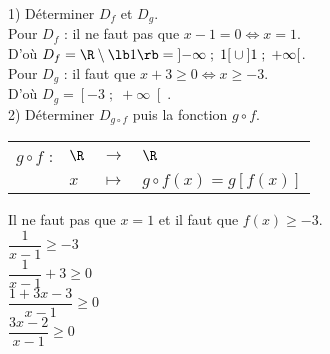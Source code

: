\vspace*{.3cm}

1) Déterminer $D_f$ et $D_g$. \\

Pour $D_f$ : il ne faut pas que $ x - 1 = 0 \Longleftrightarrow x = 1$. \\

D'où $D_f = \R \setminus \lb 1 \rb = \left]-\infty \; ; \; 1 \right[ \cup \left]1 \; ; \; + \infty \right[$. \\

Pour $D_g$ : il faut que $x + 3 \geqslant 0 \Longleftrightarrow x \geqslant -3$. \\

D'où $D_g = \left[-3 \; ; \; + \infty \right[$. \\

2) Déterminer $D_{g \circ f}$ puis la fonction $g \circ f$. \\

\begin{tabular}{llll}
$g \circ f$ : & $\R$ & $\longrightarrow$ & $\R$ \\
& $x$ & $\longmapsto$ & $g \circ f\left(x\right) = g\left[f\left(x\right)\right]$ \\
\end{tabular}

\vspace*{.3cm}

Il ne faut pas que $x = 1$ et il faut que $f\left(x\right) \geqslant -3$. \\

$\dfrac{1}{x-1} \geqslant -3 $ \\

$\dfrac{1}{x-1} + 3 \geqslant 0$ \\

$\dfrac{1 + 3x - 3}{x-1} \geqslant 0$ \\

$ \dfrac{3x - 2}{x-1} \geqslant 0$ \\


\vspace*{.3cm}

